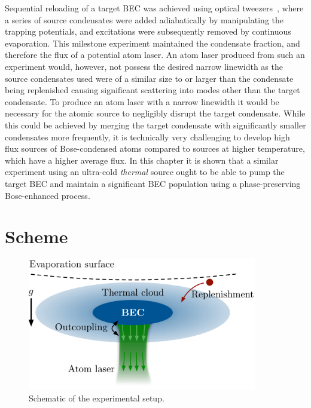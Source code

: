 Sequential reloading of a target BEC was achieved using optical tweezers~\citep{Chikkatur:2002qa}, where a series of source condensates were added adiabatically by manipulating the trapping potentials, and excitations were subsequently removed by continuous evaporation. This milestone experiment maintained the condensate fraction, and therefore the flux of a potential atom laser. An atom laser produced from such an experiment would, however, not possess the desired narrow linewidth as the source condensates used were of a similar size to or larger than the condensate being replenished causing significant scattering into modes other than the target condensate. To produce an atom laser with a narrow linewidth it would be necessary for the atomic source to negligibly disrupt the target condensate.  While this could be achieved by merging the target condensate with significantly smaller condensates more frequently, it is technically very challenging to develop high flux sources of Bose-condensed atoms compared to sources at higher temperature, which have a higher average flux. In this chapter it is shown that a similar experiment using an ultra-cold \emph{thermal} source ought to be able to pump the target BEC and maintain a significant BEC population using a phase-preserving Bose-enhanced process.



\section{Scheme}
\label{KineticTheory:Scheme}

\begin{figure}
    \centering
        \includegraphics[width=10cm]{QKTScheme}
    \caption{Schematic of the experimental setup.}
    \label{KineticTheory:QKTScheme}
\end{figure}

